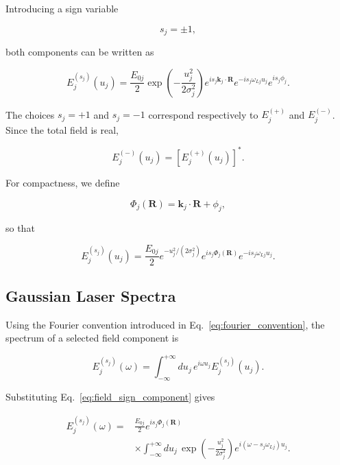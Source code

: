 \documentclass[11pt]{article}
\begin{document}
Introducing a sign variable

\begin{equation}
s_j=\pm1,
\end{equation}

both components can be written as

\begin{equation}
\boxed{
E_j^{(s_j)}(u_j)
=
\frac{E_{0j}}{2}
\exp\left(
-\frac{u_j^2}{2\sigma_j^2}
\right)
e^{is_j\mathbf{k}_j\cdot\mathbf{R}}
e^{-is_j\omega_{Lj}u_j}
e^{is_j\phi_j}.
}
\label{eq:field_sign_component}
\end{equation}

The choices $s_j=+1$ and $s_j=-1$ correspond respectively to
$E_j^{(+)}$ and $E_j^{(-)}$. Since the total field is real,

\begin{equation}
E_j^{(-)}(u_j)
=
\left[
E_j^{(+)}(u_j)
\right]^*.
\end{equation}

For compactness, we define

\begin{equation}
\Phi_j(\mathbf{R})
=
\mathbf{k}_j\cdot\mathbf{R}
+
\phi_j,
\end{equation}

so that

\begin{equation}
E_j^{(s_j)}(u_j)
=
\frac{E_{0j}}{2}
e^{-u_j^2/(2\sigma_j^2)}
e^{is_j\Phi_j(\mathbf{R})}
e^{-is_j\omega_{Lj}u_j}.
\end{equation}


\subsection{Gaussian Laser Spectra}

Using the Fourier convention introduced in
Eq.~\eqref{eq:fourier_convention}, the spectrum of a selected field
component is

\begin{equation}
E_j^{(s_j)}(\omega)
=
\int_{-\infty}^{+\infty}
du_j\,
e^{i\omega u_j}
E_j^{(s_j)}(u_j).
\label{eq:laser_spectrum_definition}
\end{equation}

Substituting Eq.~\eqref{eq:field_sign_component} gives

\begin{align}
E_j^{(s_j)}(\omega)
={}&
\frac{E_{0j}}{2}
e^{is_j\Phi_j(\mathbf{R})}
\nonumber\\
&\times
\int_{-\infty}^{+\infty}
du_j\,
\exp\left(
-\frac{u_j^2}{2\sigma_j^2}
\right)
e^{i(\omega-s_j\omega_{Lj})u_j}.
\end{align}
\end{document}
